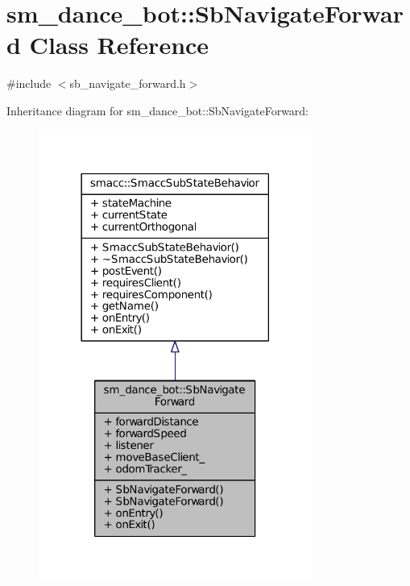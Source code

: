 \hypertarget{classsm__dance__bot_1_1SbNavigateForward}{}\section{sm\+\_\+dance\+\_\+bot\+:\+:Sb\+Navigate\+Forward Class Reference}
\label{classsm__dance__bot_1_1SbNavigateForward}


{\ttfamily \#include $<$sb\+\_\+navigate\+\_\+forward.\+h$>$}



Inheritance diagram for sm\+\_\+dance\+\_\+bot\+:\+:Sb\+Navigate\+Forward\+:
\nopagebreak
\begin{figure}[H]
\begin{center}
\leavevmode
\includegraphics[width=254pt]{classsm__dance__bot_1_1SbNavigateForward__inherit__graph}
\end{center}
\end{figure}


